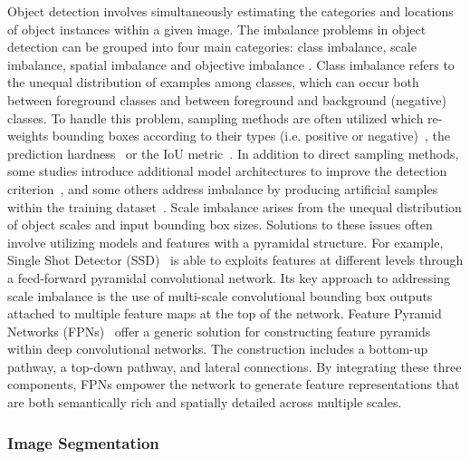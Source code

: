 Object detection involves simultaneously estimating the categories and locations of object instances within a given image. The imbalance problems in object detection can be grouped into four main categories: class imbalance, scale imbalance, spatial imbalance and objective imbalance \cite{oksuz2020imbalance}. Class imbalance refers to the unequal distribution of examples among classes, which can occur both between foreground classes and between foreground and background (negative) classes. To handle this problem, sampling methods are often utilized which re-weights bounding boxes according to their types (i.e. positive or negative)~\cite{girshick2014rich, liu2016ssd}, the prediction hardness~\cite{ross2017focal, li2019gradient} or the IoU metric~\cite{cao2020prime}. In addition to direct sampling methods, some studies introduce additional model architectures to improve the detection criterion~\cite{chen2022residual, chen2019towards}, and some others address imbalance by producing artificial samples within the training dataset~\cite{wang2017fast,tripathi2019learning}.  Scale imbalance arises from the unequal distribution of object scales and input bounding box sizes. Solutions to these issues often involve utilizing models and features with a pyramidal structure. For example, Single Shot Detector (SSD)~\cite{liu2016ssd} is able to exploits features at different levels through a feed-forward pyramidal convolutional network. Its key approach to addressing scale imbalance is the use of multi-scale convolutional bounding box outputs attached to multiple feature maps at the top of the network. Feature Pyramid Networks (FPNs)~\cite{lin2017feature} offer a generic solution for constructing feature pyramids within deep convolutional networks. The construction includes a bottom-up pathway, a top-down pathway, and lateral connections. By integrating these three components, FPNs empower the network to generate feature representations that are both semantically rich and spatially detailed across multiple scales.


\subsubsection{Image Segmentation}\ 

